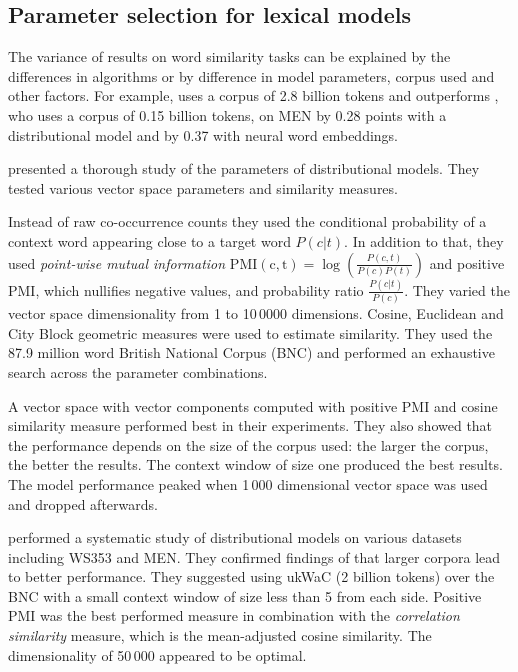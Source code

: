 \subsection{Parameter selection for lexical models}
\label{sec:parameter-selection-intro}

The variance of results on word similarity tasks can be explained by the differences in algorithms or by difference in model parameters, corpus used and other factors. For example,  uses a corpus of 2.8 billion tokens and outperforms , who uses a corpus of 0.15 billion tokens, on MEN by 0.28 points with a distributional model and by 0.37 with neural word embeddings.

 presented a thorough study of the parameters of distributional models. They tested various vector space parameters and similarity measures.

Instead of raw co-occurrence counts they used the conditional probability of a context word appearing close to a target word $P(c|t)$. In addition to that, they used \emph{point-wise mutual information} $\operatorname{PMI(c,t)} = \log\left(\frac{P(c,t)}{P(c)P(t)}\right)$ and positive PMI, which nullifies negative values, and probability ratio $\frac{P(c|t)}{P(c)}$. They varied the vector space dimensionality from 1 to 10\,0000 dimensions.  Cosine, Euclidean and City Block geometric measures were used to estimate similarity. They used the 87.9 million word British National Corpus (BNC) and performed an exhaustive search across the parameter combinations.

A vector space with vector components computed with positive PMI and cosine similarity measure performed best in their experiments. They also showed that the performance depends on the size of the corpus used: the larger the corpus, the better the results. The context window of size one produced the best results. The model performance peaked when 1\,000 dimensional vector space was used and dropped afterwards.

 performed a systematic study of distributional models on various datasets including WS353 and MEN. They confirmed findings of  that larger corpora lead to better performance. They suggested using ukWaC (2 billion tokens) over the BNC with a small context window of size less than 5 from each side. Positive PMI was the best performed measure in combination with the \emph{correlation similarity} measure, which is the mean-adjusted cosine similarity. The dimensionality of 50\,000 appeared to be optimal.

